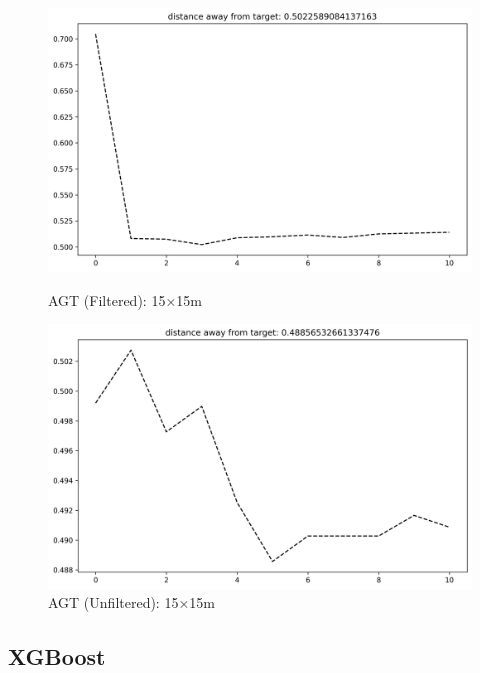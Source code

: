 \documentclass[runningheads]{llncs}
\begin{document}
\begin{figure}[H]
	\centering
	\begin{minipage}{0.49\textwidth}
		\centering
		\includegraphics[width=\textwidth]{figures/filtered/svm_custom_15.png}
		\caption*{AGT (Filtered): 15×15m}
	\end{minipage}
	\hfill
	\begin{minipage}{0.49\textwidth}
		\centering
		\includegraphics[width=\textwidth]{figures/unfiltered/svm_custom_15.png}
		\caption*{AGT (Unfiltered): 15×15m}
	\end{minipage}
\end{figure}

\clearpage

\subsection*{XGBoost}
\end{document}
